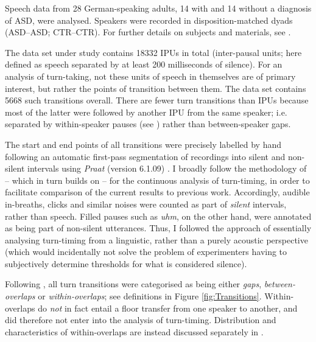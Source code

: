 Speech data from 28 German-speaking adults, 14 with and 14 without a diagnosis of ASD, were analysed. Speakers were recorded in disposition-matched dyads (ASD--ASD; CTR--CTR). For further details on subjects and materials, see .

The data set under study contains 18332 IPUs in total (inter-pausal units; here defined as speech separated by at least 200 milliseconds of silence). For an analysis of turn-taking, not these units of speech in themselves are of primary interest, but rather the points of transition between them. The data set contains 5668 such transitions overall. There are fewer turn transitions than IPUs because most of the latter were followed by another IPU from the same speaker; i.e. separated by within-speaker pauses (see ) rather than between-speaker gaps.

The start and end points of all transitions were precisely labelled by hand following an automatic first-pass segmentation of recordings into silent and non-silent intervals using  \emph{Praat} (version 6.1.09) \citep{boersmaPRAATDoingPhonetics2021}. I broadly follow the methodology of \citet{levinsonTimingTurntakingIts2015a} -- which in turn builds on \citet{heldnerPausesGapsOverlaps2010} -- for the continuous analysis of turn-timing, in order to facilitate comparison of the current results to previous work. Accordingly, audible in-breaths, clicks and similar noises were counted as part of \emph{silent} intervals, rather than speech. Filled pauses such as \emph{uhm}, on the other hand, were annotated as being part of non-silent utterances. Thus, I followed the approach of essentially analysing turn-timing from a linguistic, rather than a purely acoustic perspective (which would incidentally not solve the problem of experimenters having to subjectively determine thresholds for what is considered silence).

Following \citet{levinsonTimingTurntakingIts2015a}, all turn transitions were categorised as being either \textit{gaps}, \textit{between-overlaps} or \textit{within-overlaps}; see definitions in Figure \ref{fig:Transitions}. Within-overlaps do \emph{not} in fact entail a floor transfer from one speaker to another, and did therefore not enter into the analysis of turn-timing. Distribution and characteristics of within-overlaps are instead discussed separately in .



